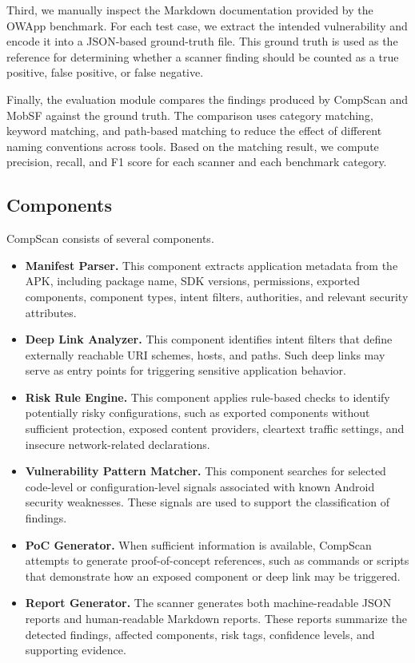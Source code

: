 \documentclass[sigconf, nonacm]{acmart}
\begin{document}
Third, we manually inspect the Markdown documentation provided by the OWApp benchmark. For each test case, we extract the intended vulnerability and encode it into a JSON-based ground-truth file. This ground truth is used as the reference for determining whether a scanner finding should be counted as a true positive, false positive, or false negative.

Finally, the evaluation module compares the findings produced by CompScan and MobSF against the ground truth. The comparison uses category matching, keyword matching, and path-based matching to reduce the effect of different naming conventions across tools. Based on the matching result, we compute precision, recall, and F1 score for each scanner and each benchmark category.

\subsection{Components}

CompScan consists of several components.

\begin{itemize}
    \item \textbf{Manifest Parser.} This component extracts application metadata from the APK, including package name, SDK versions, permissions, exported components, component types, intent filters, authorities, and relevant security attributes.
    
    \item \textbf{Deep Link Analyzer.} This component identifies intent filters that define externally reachable URI schemes, hosts, and paths. Such deep links may serve as entry points for triggering sensitive application behavior.
    
    \item \textbf{Risk Rule Engine.} This component applies rule-based checks to identify potentially risky configurations, such as exported components without sufficient protection, exposed content providers, cleartext traffic settings, and insecure network-related declarations.
    
    \item \textbf{Vulnerability Pattern Matcher.} This component searches for selected code-level or configuration-level signals associated with known Android security weaknesses. These signals are used to support the classification of findings.
    
    \item \textbf{PoC Generator.} When sufficient information is available, CompScan attempts to generate proof-of-concept references, such as commands or scripts that demonstrate how an exposed component or deep link may be triggered.
    
    \item \textbf{Report Generator.} The scanner generates both machine-readable JSON reports and human-readable Markdown reports. These reports summarize the detected findings, affected components, risk tags, confidence levels, and supporting evidence.
\end{itemize}
\end{document}
